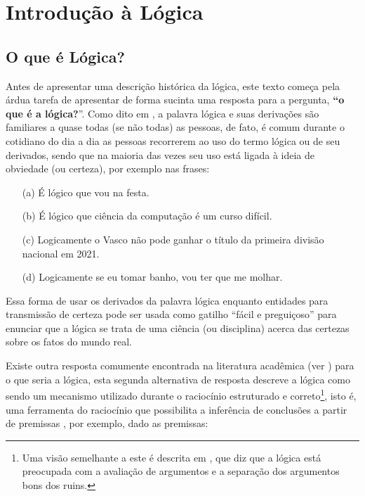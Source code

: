 \chapter{Introdução à Lógica}\label{cap:IntroducaoLogica}

\section{O que é Lógica?}\label{sec:O-que-e-Logica}

Antes de apresentar uma descrição histórica da lógica, este texto começa pela árdua tarefa de apresentar de forma sucinta uma resposta para a pergunta, \textbf{``o que é a lógica?}''. Como dito em \cite{BenjaV1, copi1981}, a palavra lógica e suas derivações são familiares a quase todas (se não todas) as pessoas, de fato, é comum durante o cotidiano do dia a dia as pessoas recorrerem ao uso do termo lógica ou de seu derivados, sendo que na maioria das vezes seu uso está ligada à ideia de obviedade (ou certeza), por exemplo nas frases:

\begin{itemize}
    \item[(a)] É lógico que vou na festa.
    \item[(b)] É lógico que ciência da computação é um curso difícil.
    \item[(c)] Logicamente o Vasco não pode ganhar o título da primeira divisão nacional em 2021.
    \item[(d)] Logicamente se eu tomar banho, vou ter que me molhar.
\end{itemize}

Essa forma de usar os derivados da palavra lógica enquanto entidades para transmissão de certeza pode ser usada como gatilho ``fácil e preguiçoso'' para enunciar que a lógica se trata de uma ciência (ou disciplina) acerca das certezas sobre os fatos do mundo real. 

Existe outra resposta comumente encontrada na literatura acadêmica (ver \cite{abe2002-logica, BenjaV1, joaoPavao2014}) para o que seria a lógica, esta segunda alternativa de resposta  descreve a lógica como sendo um mecanismo utilizado durante o raciocínio estruturado e correto\footnote{Uma visão semelhante a este é descrita em \cite{magnus2020}, que diz que a lógica está preocupada com a avaliação de argumentos e a separação dos argumentos bons dos ruins.}, isto é, uma ferramenta do raciocínio que possibilita a inferência de conclusões a partir de premissas \cite{abe2002-logica, copi1981, hodges1997}, por exemplo, dado as premissas:


